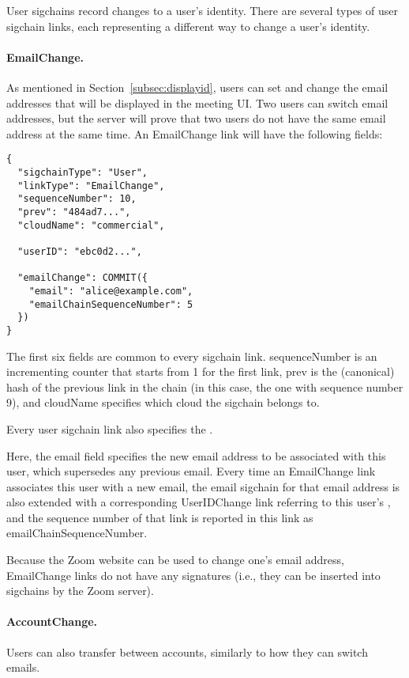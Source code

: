 User sigchains record changes to a user’s identity. There are several types of user sigchain links,
each representing a different way to change a user's identity.

\paragraph{EmailChange.} As mentioned in Section~\ref{subsec:displayid}, users can set and change the
email addresses that will be displayed in the meeting UI\@. Two users can switch email addresses,
but the server will prove that two users do not have the same email address at the same time. An
\textsf{EmailChange} link will have the following fields:


\begin{Verbatim}
{
  "sigchainType": "User",
  "linkType": "EmailChange",
  "sequenceNumber": 10,
  "prev": "484ad7...",
  "cloudName": "commercial",

  "userID": "ebc0d2...",

  "emailChange": COMMIT({
    "email": "alice@example.com",
    "emailChainSequenceNumber": 5
  })
}
\end{Verbatim}

The first six fields are common to every sigchain link. \textsf{sequenceNumber} is an incrementing counter that starts from 1 for the first link, \textsf{prev} is the (canonical) hash of the previous link in the chain (in this case,
the one with sequence number 9), and \textsf{cloudName}
specifies which cloud the sigchain belongs to.

Every user sigchain link also specifies the \userID.

Here, the \textsf{email} field specifies the new email address to be associated with this user,
which supersedes any previous email. Every time an \textsf{EmailChange} link associates this user
with a new email, the email sigchain for that email address is also extended with a corresponding
\textsf{UserIDChange} link referring to this user’s \userID, and the sequence number of that link is
reported in this link as \textsf{emailChainSequenceNumber}.

Because the Zoom website can be used to change one's email address, \textsf{EmailChange} links do
not have any signatures (i.e., they can be inserted into sigchains by the Zoom server).

\paragraph{AccountChange.} Users can also transfer between accounts, similarly to how they can
switch emails.

